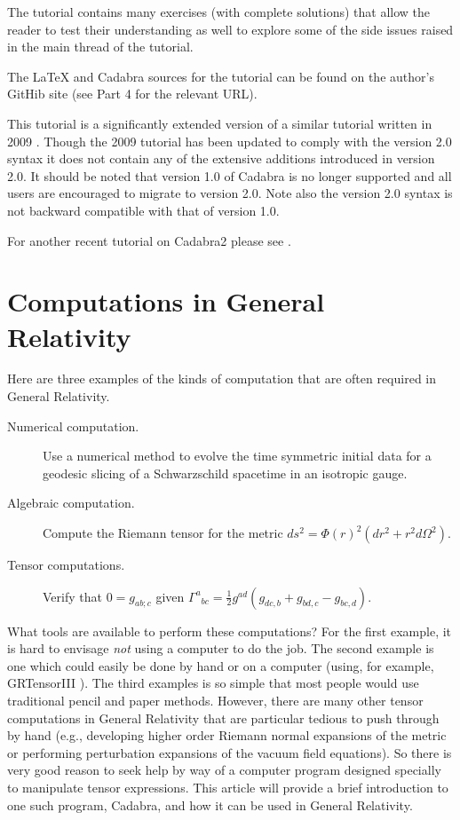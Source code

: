 \documentclass[a4paper,12pt]{article}
\numberwithin{equation}{section}%
\begin{document}
The tutorial contains many exercises (with complete solutions) that allow the reader to test
their understanding as well to explore some of the side issues raised in the main thread of
the tutorial.

The LaTeX and Cadabra sources for the tutorial can be found on the author's GitHib site
(see Part 4 for the relevant URL).

This tutorial is a significantly extended version of a similar tutorial written in 2009
\cite{brewin:2009-02}. Though the 2009 tutorial has been updated to comply with the
version 2.0 syntax it does not contain any of the extensive additions introduced in version
2.0. It should be noted that version 1.0 of Cadabra is no longer supported and all users are
encouraged to migrate to version 2.0. Note also the version 2.0 syntax is not backward
compatible with that of version 1.0.

For another recent tutorial on Cadabra2 please see \cite{kulyabov:2019-01}.

\clearpage

\section*{Computations in General Relativity}

Here are three examples of the kinds of computation that are often required in General
Relativity.

\begin{description}
\item[Numerical computation.]\hfil\break\vskip-15pt
Use a numerical method to evolve the time symmetric initial data for a geodesic slicing of a
Schwarzschild spacetime in an isotropic gauge.

\item[Algebraic computation.]\hfil\break\vskip-15pt
Compute the Riemann tensor for the metric $ds^2=\Phi(r)^2\left(dr^2+r^2d\Omega^2\right)$.

\item[Tensor computations.]\hfil\break\vskip-15pt
Verify that $0=g_{ab;c}$ given
$\Gamma^{a}{}_{bc} = \frac{1}{2}g^{ad}\left(g_{dc,b} + g_{bd,c} - g_{bc,d}\right)$.
\end{description}

What tools are available to perform these computations? For the first example, it is hard to
envisage \emph{not} using a computer to do the job. The second example is one which could
easily be done by hand or on a computer (using, for example, GRTensorIII
\cite{grtensorIII:2017-01}). The third examples is so simple that most people would use
traditional pencil and paper methods. However, there are many other tensor
computations in General Relativity that are particular tedious to push through by hand
(e.g., developing higher order Riemann normal expansions of the metric or performing
perturbation expansions of the vacuum field equations). So there is very good reason to seek
help by way of a computer program designed specially to manipulate tensor expressions. This
article will provide a brief introduction to one such program, Cadabra, and how it can be
used in General Relativity.
\end{document}
